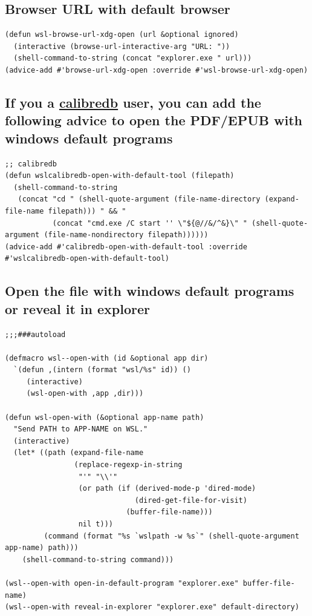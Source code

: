 \documentclass[10pt]{article}
\begin{document}
\subsection{Browser URL with default browser}
\label{sec:org7aa5d13}
\begin{verbatim}
(defun wsl-browse-url-xdg-open (url &optional ignored)
  (interactive (browse-url-interactive-arg "URL: "))
  (shell-command-to-string (concat "explorer.exe " url)))
(advice-add #'browse-url-xdg-open :override #'wsl-browse-url-xdg-open)
\end{verbatim}

\subsection{If you a \href{https://github.com/chenyanming/calibredb.el}{calibredb} user, you can add the following advice to open the PDF/EPUB with windows default programs}
\label{sec:orga735156}

\begin{verbatim}
;; calibredb
(defun wslcalibredb-open-with-default-tool (filepath)
  (shell-command-to-string
   (concat "cd " (shell-quote-argument (file-name-directory (expand-file-name filepath))) " && "
           (concat "cmd.exe /C start '' \"${@//&/^&}\" " (shell-quote-argument (file-name-nondirectory filepath))))))
(advice-add #'calibredb-open-with-default-tool :override #'wslcalibredb-open-with-default-tool)
\end{verbatim}

\subsection{Open the file with windows default programs or reveal it in explorer}
\label{sec:org636c34a}
\begin{verbatim}
;;;###autoload

(defmacro wsl--open-with (id &optional app dir)
  `(defun ,(intern (format "wsl/%s" id)) ()
     (interactive)
     (wsl-open-with ,app ,dir)))

(defun wsl-open-with (&optional app-name path)
  "Send PATH to APP-NAME on WSL."
  (interactive)
  (let* ((path (expand-file-name
                (replace-regexp-in-string
                 "'" "\\'"
                 (or path (if (derived-mode-p 'dired-mode)
                              (dired-get-file-for-visit)
                            (buffer-file-name)))
                 nil t)))
         (command (format "%s `wslpath -w %s`" (shell-quote-argument app-name) path)))
    (shell-command-to-string command)))

(wsl--open-with open-in-default-program "explorer.exe" buffer-file-name)
(wsl--open-with reveal-in-explorer "explorer.exe" default-directory)
\end{verbatim}
\end{document}
